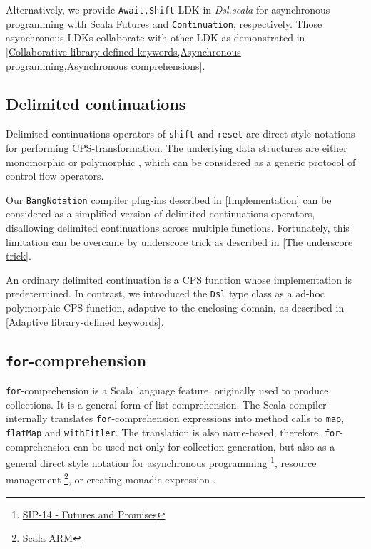 Alternatively, we provide \lstinline{Await,Shift} LDK in \textit{Dsl.scala} for asynchronous programming with Scala Futures and \lstinline{Continuation}, respectively. Those asynchronous LDKs collaborate with other LDK as demonstrated in \cref{Collaborative library-defined keywords,Asynchronous programming,Asynchronous comprehensions}.

\subsection{Delimited continuations}

Delimited continuations operators of \lstinline{shift} and \lstinline{reset} \cite{Danvy1990AbstractingC} are direct style notations for performing CPS-transformation. The underlying data structures are either monomorphic \cite{danvy1989functional} or polymorphic \cite{asai2007polymorphic}, which can be considered as a generic protocol of control flow operators.

Our \lstinline{BangNotation} compiler plug-ins described in \cref{Implementation} can be considered as a simplified version of delimited continuations operators, disallowing delimited continuations across multiple functions. Fortunately, this limitation can be overcame by underscore trick as described in \cref{The underscore trick}.

An ordinary delimited continuation is a CPS function whose implementation is predetermined. In contrast, we introduced the \lstinline{Dsl} type class as a ad-hoc polymorphic CPS function, adaptive to the enclosing domain, as described in \cref{Adaptive library-defined keywords}.

\subsection{\lstinline{for}-comprehension}\label{for-comprehension}

\lstinline{for}-comprehension is a Scala language feature, originally used to produce collections. It is a general form of list comprehension. The Scala compiler internally translates \lstinline{for}-comprehension expressions into method calls to \lstinline{map}, \lstinline{flatMap} and \lstinline{withFitler}. The translation is also name-based, therefore, \lstinline{for}-comprehension can be used not only for collection generation, but also as a general direct style notation for asynchronous programming \footnote{\href{https://docs.scala-lang.org/sips/futures-promises.html}{SIP-14 - Futures and Promises}}, resource management \footnote{\href{http://jsuereth.com/scala-arm/}{Scala ARM}}, or creating monadic expression \cite{kenji2017scalaz,typelevel2017cats,twitter2016algebird}.

